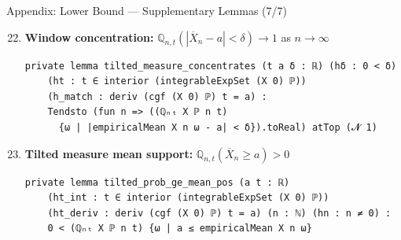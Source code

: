 \documentclass[aspectratio=169]{beamer}
\newcommand{\Q}{\mathbb{Q}}
\begin{document}
\begin{frame}[fragile]{Appendix: Lower Bound --- Supplementary Lemmas (7/7)}
  \begin{enumerate}\setcounter{enumi}{21}
    \item \textbf{Window concentration:} $\Q_{n,t}(|\overline{X}_n - a| < \delta) \to 1$ as $n \to \infty$
\begin{lstlisting}[basicstyle=\ttfamily\tiny]
private lemma tilted_measure_concentrates (t a δ : ℝ) (hδ : 0 < δ)
    (ht : t ∈ interior (integrableExpSet (X 0) ℙ))
    (h_match : deriv (cgf (X 0) ℙ) t = a) :
    Tendsto (fun n => ((ℚₙₜ X ℙ n t)
      {ω | |empiricalMean X n ω - a| < δ}).toReal) atTop (𝓝 1)
\end{lstlisting}
    \item \textbf{Tilted measure mean support:} $\Q_{n,t}(\overline{X}_n \ge a) > 0$
\begin{lstlisting}[basicstyle=\ttfamily\tiny]
private lemma tilted_prob_ge_mean_pos (a t : ℝ)
    (ht_int : t ∈ interior (integrableExpSet (X 0) ℙ))
    (ht_deriv : deriv (cgf (X 0) ℙ) t = a) (n : ℕ) (hn : n ≠ 0) :
    0 < (ℚₙₜ X ℙ n t) {ω | a ≤ empiricalMean X n ω}
\end{lstlisting}
  \end{enumerate}
\end{frame}
\end{document}

